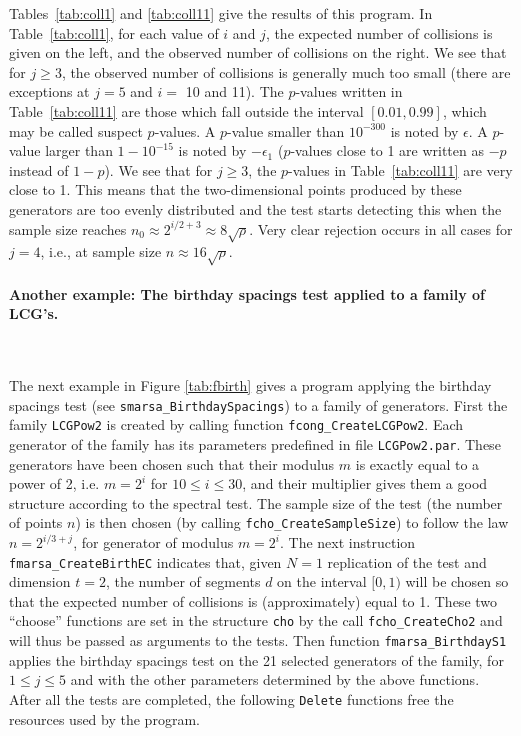 

Tables~\ref{tab:coll1} and \ref{tab:coll11} give the results
of this program.
In Table~\ref{tab:coll1}, for each value of $i$ and $j$, the expected
number of collisions is given on the left, and the observed number of
collisions on the right.
We see that for $j\ge 3$, the observed number of collisions is generally
much too small (there are exceptions at $j=5$ and $i =$ 10 and 11).
The $p$-values written in Table~\ref{tab:coll11} are those which fall
outside the interval $[0.01, 0.99]$, which may be called suspect $p$-values.
A $p$-value smaller than $10^{-300}$ is noted by $\epsilon$.
A $p$-value larger than $1 - 10^{-15}$ is noted by $-\epsilon_1$
($p$-values close to 1 are written as $-p$ instead of $1-p$).
We see that for $j\ge 3$, the $p$-values in Table~\ref{tab:coll11}
are very close to 1.
This means that the two-dimensional points produced by these generators
are too evenly distributed and the test starts detecting this when the
sample size reaches $n_0 \approx 2^{i/2 + 3} \approx 8 \sqrt{\rho}$.
Very clear rejection occurs in all cases for $j=4$, i.e., at sample size
$n \approx 16 \sqrt{\rho}$.





\paragraph*{Another example: The {birthday spacings} test applied
  to a family of LCG's.} \

The next example in Figure \ref{tab:fbirth} gives a program applying the
{birthday spacings} test (see {\tt smarsa\_BirthdaySpacings}) to a
family of generators.
First the family {\tt LCGPow2} is created by calling
function {\tt fcong\_CreateLCGPow2}. Each generator of the family
has its parameters predefined in file {\tt LCGPow2.par}. These generators
have been chosen such that their modulus $m$ is exactly equal to a power of 2,
i.e. $m = 2^i$ for $10 \le i \le 30$, and their multiplier
gives them a good structure according to the spectral test.
The sample size of the test (the number of points $n$) is then chosen
(by calling {\tt fcho\_CreateSampleSize}) to follow the law $n = 2^{i/3 + j}$,
for generator of modulus $m=2^i$.
The next instruction {\tt fmarsa\_CreateBirthEC} indicates that, given
$N=1$ replication of the test and dimension $t=2$, the number of segments $d$
on the interval $[0, 1)$ will be chosen so that the expected
number of collisions is (approximately) equal to 1.
These two ``choose'' functions are set in the structure {\tt cho} by the call
{\tt fcho\_CreateCho2} and will thus be
 passed as arguments to the tests.
Then function {\tt fmarsa\_BirthdayS1} applies the birthday spacings test
on the 21 selected generators of the family, for $1 \le j \le 5$ and with the
other parameters determined by the above functions. After all the tests are
completed, the following {\tt Delete} functions free the resources used
by the program.


